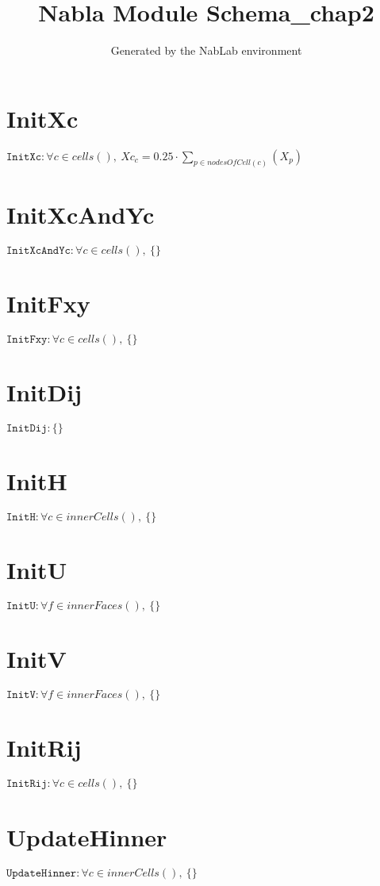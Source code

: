 \documentclass[11pt]{article}
\title{Nabla Module Schema_chap2}
\author{Generated by the NabLab environment}
\begin{document}
\maketitle


\section{InitXc}
$\texttt{InitXc} : \forall{c\in cells()}, \ Xc_{c} = 0.25 \cdot \sum_{p\in nodesOfCell(c)}\left(X_{p}\right)$


\section{InitXcAndYc}
$\texttt{InitXcAndYc} : \forall{c\in cells()}, \ \{ \}$


\section{InitFxy}
$\texttt{InitFxy} : \forall{c\in cells()}, \ \{ \}$


\section{InitDij}
$\texttt{InitDij} : \{ \}$


\section{InitH}
$\texttt{InitH} : \forall{c\in innerCells()}, \ \{ \}$


\section{InitU}
$\texttt{InitU} : \forall{f\in innerFaces()}, \ \{ \}$


\section{InitV}
$\texttt{InitV} : \forall{f\in innerFaces()}, \ \{ \}$


\section{InitRij}
$\texttt{InitRij} : \forall{c\in cells()}, \ \{ \}$


\section{UpdateHinner}
$\texttt{UpdateHinner} : \forall{c\in innerCells()}, \ \{ \}$
\end{document}

